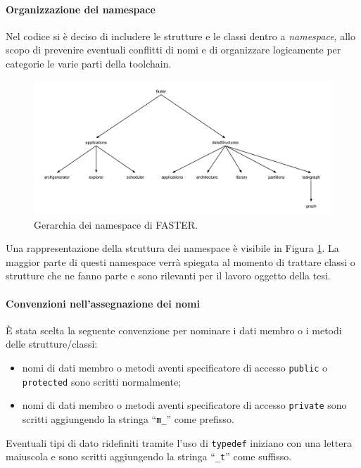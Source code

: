 \paragraph{Organizzazione dei namespace}
Nel codice si è deciso di includere le strutture e le classi dentro a 
\emph{namespace}, allo scopo di prevenire eventuali conflitti di nomi e di 
organizzare logicamente per categorie le varie parti della toolchain.

\begin{figure}
 \begin{center}
\includegraphics[width=\textwidth]{capitoli/figure/cap4/FASTERNamespaces.pdf}
\caption{Gerarchia dei namespace di \acs{FASTER}.}
\label{fig:gerarchiaNamespace}
 \end{center}
\end{figure}

Una rappresentazione della struttura dei namespace è visibile in Figura 
\ref{fig:gerarchiaNamespace}. La maggior parte di questi namespace verrà 
spiegata al momento di trattare classi o strutture che ne fanno parte 
e sono rilevanti per il lavoro oggetto della tesi.

\paragraph{Convenzioni nell'assegnazione dei nomi}
È stata scelta la seguente convenzione per nominare i dati membro o i metodi 
delle strutture/classi:
\begin{itemize}
 \item nomi di dati membro o metodi aventi specificatore di accesso 
\verb+public+ o \verb+protected+ sono scritti normalmente;
 \item nomi di dati membro o metodi aventi specificatore di accesso 
\verb+private+ sono scritti aggiungendo la stringa ``\verb+m_+'' come prefisso.
\end{itemize}

Eventuali tipi di dato ridefiniti tramite l'uso di \verb+typedef+ iniziano 
con una lettera maiuscola e sono scritti aggiungendo la stringa ``\verb+_t+'' 
come suffisso.

